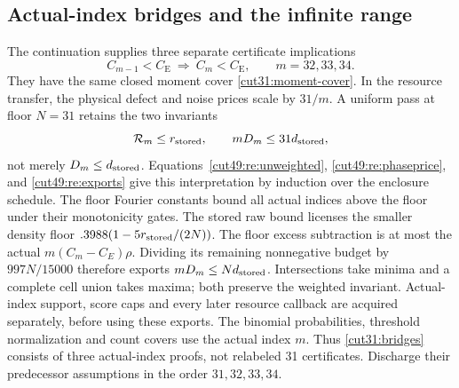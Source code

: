\documentclass[11pt,a4paper]{article}
\numberwithin{equation}{section}
\theoremstyle{definition}
\theoremstyle{remark}
\newcommand{\CE}{C_{\mathrm E}}
\begin{document}
\subsection{Actual-index bridges and the infinite range}
The continuation supplies three separate certificate implications
\begin{equation}\label{cut31:bridges}
 C_{m-1}<\CE\ \Longrightarrow\ C_m<\CE,
 \qquad m=32,33,34.
\end{equation}
They have the same closed moment cover \eqref{cut31:moment-cover}.
In the resource transfer, the physical defect and noise prices
scale by \(31/m\). A uniform pass at floor \(N=31\) retains
the two invariants
\[
 \mathcal R_m\le r_{\rm stored},\qquad
 mD_m\le31d_{\rm stored},
\]
not merely \(D_m\le d_{\rm stored}\).
Equations~\eqref{cut49:re:unweighted},
\eqref{cut49:re:phaseprice}, and \eqref{cut49:re:exports}
give this interpretation by induction over the enclosure schedule.
The floor Fourier constants bound all actual indices above the
floor under their monotonicity gates. The stored raw bound licenses
the smaller density floor \(.3988(1-5r_{\rm stored}/(2N))\).
The floor excess subtraction is at most the actual
\(m(C_m-C_E)\rho\). Dividing its remaining nonnegative budget
by \(997N/15000\) therefore exports \(mD_m\le Nd_{\rm stored}\).
Intersections take minima and a complete cell union takes maxima;
both preserve the weighted invariant. Actual-index support, score
caps and every later resource callback are acquired separately,
before using these exports.
The binomial probabilities, threshold
normalization and count covers use the actual index \(m\).
Thus \eqref{cut31:bridges} consists of three actual-index proofs,
not relabeled 31 certificates. Discharge their predecessor
assumptions in the order \(31,32,33,34\).
\end{document}
